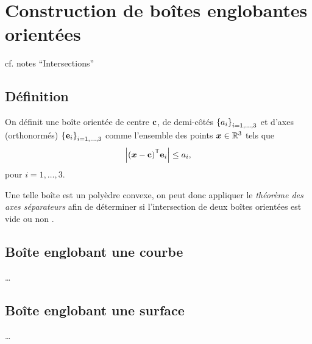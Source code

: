 \chapter{Construction de boîtes englobantes orientées}
\label{app:obb}

cf. notes ``Intersections''

\section{Définition}
On définit une boîte orientée de centre $\mathbf{c}$, de demi-côtés $\left\{{a}_{i}\right\}_{{i}={1},\ldots,{3}}$ et d'axes (orthonormés) $\left\{{\mathbf{e}}_{i}\right\}_{{i}={1},\ldots,{3}}$ comme l'ensemble des points $\boldsymbol{x} \in \mathbb{R}^3$ tels que
\begin{equation}
	\left| {\left(\boldsymbol{x} - \mathbf{c}\right)} ^\mathsf{T} {\mathbf{e}_i} \right| \leq a_i,
	\label{eq:def_obb}
\end{equation}
pour $i = 1,\ldots,3$.\par
    Une telle boîte est un polyèdre convexe, on peut donc appliquer le \textit{théorème des axes séparateurs} afin de déterminer si l’intersection de deux boîtes orientées est vide ou non \cite{eberly2002}.
    
\section{Boîte englobant une courbe}
\ldots

\section{Boîte englobant une surface}
\ldots